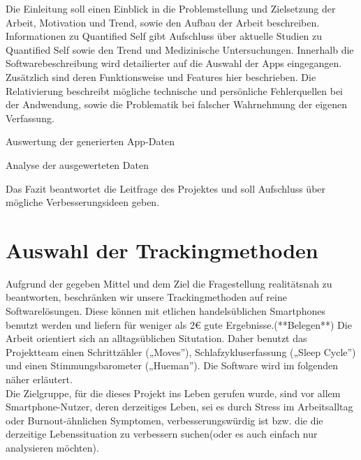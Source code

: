 Die Einleitung soll einen Einblick in die Problemstellung und Zielsetzung der Arbeit, Motivation und Trend, sowie den Aufbau der Arbeit beschreiben.
Informationen zu Quantified Self gibt Aufschluss über aktuelle Studien zu Quantified Self sowie den Trend und Medizinische Untersuchungen.
Innerhalb die Softwarebeschreibung wird detailierter auf die Auswahl der Apps eingegangen. \\
Zusätzlich sind deren Funktionsweise und Features hier beschrieben.
Die Relativierung beschreibt mögliche technische und persönliche Fehlerquellen bei der Andwendung, sowie die Problematik bei falscher Wahrnehmung der eigenen Verfassung.


Auswertung der generierten App-Daten


Analyse der ausgewerteten Daten


Das Fazit beantwortet die Leitfrage des Projektes und soll Aufschluss über mögliche Verbesserungsideen geben.

\section{Auswahl der Trackingmethoden}
\label{ch:Einleitung:sec:AuswahlDerTrackingmethoden}

Aufgrund der gegeben Mittel und dem Ziel die Fragestellung realitätsnah zu beantworten, beschränken wir unsere Trackingmethoden auf reine Softwarelösungen. 
Diese können mit etlichen handelsüblichen Smartphones benutzt werden und liefern für weniger als 2\euro{} gute Ergebnisse.(**Belegen**) 
Die Arbeit orientiert sich an alltagsüblichen Situtation. 
Daher benutzt das Projektteam einen Schrittzähler („Moves”), Schlafzykluserfassung („Sleep Cycle”) und einen Stimmungsbarometer („Hueman”).
Die Software wird im folgenden näher erläutert. \\
Die Zielgruppe, für die dieses Projekt ins Leben gerufen wurde, sind vor allem Smartphone-Nutzer, deren derzeitiges Leben, sei es durch Stress im Arbeitsalltag oder Burnout-ähnlichen Symptomen, verbesserungswürdig ist bzw. die die derzeitige Lebenssituation zu verbessern suchen(oder es auch einfach nur analysieren möchten).  

